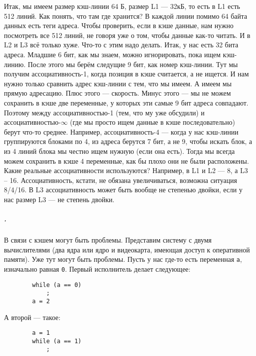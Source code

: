 \documentclass{article}
\begin{document}
    Итак, мы имеем размер кэш-линии 64 Б, размер L1 --- 32кБ, то есть в L1 есть 512 линий. Как понять, что там где хранится? В каждой линии помимо 64 байта данных есть теги адреса. Чтобы проверить, если в кэше данные, нам нужно посмотреть все 512 линий, не говоря уже о том, чтобы данные как-то читать. И в L2 и L3 всё только хуже. Что-то с этим надо делать. Итак, у нас есть 32 бита адреса. Младшие 6 бит, как мы знаем, можно игнорировать, пока ищем кэш-линию. После этого мы берём следущие 9 бит, как номер кэш-линии. Тут мы получим ассоциативность-1, когда позиция в кэше считается, а не ищется. И нам нужно только сравнить адрес кэш-линии с тем, что мы имеем. А имеем мы прямую адресацию. Плюс этого --- скорость. Минус этого --- мы не можем сохранить в кэше две переменные, у которых эти самые 9 бит адреса совпадают. Поэтому между ассоциативностью-1 (тем, что му уже обсудили) и ассоциативностью-$\infty$ (где мы просто ищем данные в кэше последовательно) берут что-то среднее. Например, ассоциативность-4 --- когда у нас кэш-линии группируются блоками по 4, из адреса берутся 7 бит, а не 9, чтобы искать блок, а из 4 линий блока мы честно ищем нужную (если она есть). Тогда мы всегда можем сохранить в кэше 4 переменные, как бы плохо они не были расположены. Какие реальные ассоциативности используются? Например, в L1 и L2 --- 8, а L3 -- 16. Ассоциативность, кстати, не обязана увеличиваться, возможна ситуация 8/4/16. В L3 ассоциативность может быть вообще не степенью двойки, если у нас размер L3 --- не степень двойки.
    \subparagraph{.}
    В связи с кэшем могут быть проблемы. Представим систему с двумя вычислителями (два ядра или ядро и видеокарта, имеющая доступ к оперативной памяти). Уже тут могут быть проблемы. Пусть у нас где-то есть переменная \texttt{a}, изначально равная \texttt{0}. Первый исполнитель делает следующее:
    \begin{verbatim}
        while (a == 0)
            ;
        a = 2
    \end{verbatim}
    А второй --- такое:
    \begin{verbatim}
        a = 1
        while (a == 1)
            ;
    \end{verbatim}
\end{document}
